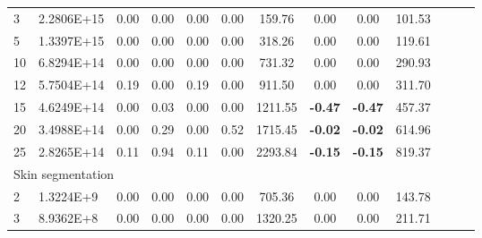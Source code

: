 {\begin{longtable}{@{}llccccccccccc@{}}
\multicolumn{1}{l|}{3}  & \multicolumn{1}{l|}{2.2806E+15} & \multicolumn{1}{c|}{0.00}    & \multicolumn{1}{c|}{0.00} & \multicolumn{1}{c|}{0.00}   & 0.00 & \multicolumn{1}{c|}{159.76}   & 0.00            & 0.00            & 101.53    \\
\multicolumn{1}{l|}{5}  & \multicolumn{1}{l|}{1.3397E+15} & \multicolumn{1}{c|}{0.00}    & \multicolumn{1}{c|}{0.00} & \multicolumn{1}{c|}{0.00}   & 0.00 & \multicolumn{1}{c|}{318.26}   & 0.00            & 0.00            & 119.61    \\
\multicolumn{1}{l|}{10} & \multicolumn{1}{l|}{6.8294E+14} & \multicolumn{1}{c|}{0.00}    & \multicolumn{1}{c|}{0.00} & \multicolumn{1}{c|}{0.00}   & 0.00 & \multicolumn{1}{c|}{731.32}   & 0.00            & 0.00            & 290.93    \\
\multicolumn{1}{l|}{12} & \multicolumn{1}{l|}{5.7504E+14} & \multicolumn{1}{c|}{0.19}    & \multicolumn{1}{c|}{0.00} & \multicolumn{1}{c|}{0.19}   & 0.00 & \multicolumn{1}{c|}{911.50}   & 0.00            & 0.00            & 311.70    \\
\multicolumn{1}{l|}{15} & \multicolumn{1}{l|}{4.6249E+14} & \multicolumn{1}{c|}{0.00}    & \multicolumn{1}{c|}{0.03} & \multicolumn{1}{c|}{0.00}   & 0.00 & \multicolumn{1}{c|}{1211.55}  & \textbf{-0.47}  & \textbf{-0.47}  & 457.37    \\
\multicolumn{1}{l|}{20} & \multicolumn{1}{l|}{3.4988E+14} & \multicolumn{1}{c|}{0.00}    & \multicolumn{1}{c|}{0.29} & \multicolumn{1}{c|}{0.00}   & 0.52 & \multicolumn{1}{c|}{1715.45}  & \textbf{-0.02}  & \textbf{-0.02}  & 614.96    \\
\multicolumn{1}{l|}{25} & \multicolumn{1}{l|}{2.8265E+14} & \multicolumn{1}{c|}{0.11}    & \multicolumn{1}{c|}{0.94} & \multicolumn{1}{c|}{0.11}   & 0.00 & \multicolumn{1}{c|}{2293.84}  & \textbf{-0.15}  & \textbf{-0.15}  & 819.37    \\ \hline
\multicolumn{10}{l}{Skin segmentation}                                                                                                                                                                                                    \\ \hline
\multicolumn{1}{l|}{2}  & \multicolumn{1}{l|}{1.3224E+9}  & \multicolumn{1}{c|}{0.00}    & \multicolumn{1}{c|}{0.00} & \multicolumn{1}{c|}{0.00}   & 0.00 & \multicolumn{1}{c|}{705.36}   & 0.00            & 0.00            & 143.78    \\
\multicolumn{1}{l|}{3}  & \multicolumn{1}{l|}{8.9362E+8}  & \multicolumn{1}{c|}{0.00}    & \multicolumn{1}{c|}{0.00} & \multicolumn{1}{c|}{0.00}   & 0.00 & \multicolumn{1}{c|}{1320.25}  & 0.00            & 0.00            & 211.71    \\

\end{longtable}}
